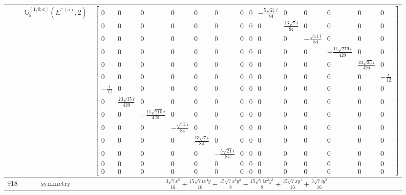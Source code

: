 \documentclass[fleqn,8pt,landscape]{jsarticle}
\begin{document}
\begin{longtable}{ccc}
$  $ & $ \mathbb{G}_{5}^{(1,0;a)}(E^{\prime\prime(a)},2) $ & $ \begin{bmatrix} 0 & 0 & 0 & 0 & 0 & 0 & 0 & 0 & - \frac{5 \sqrt{21} i}{84} & 0 & 0 & 0 & 0 & 0 \\ 0 & 0 & 0 & 0 & 0 & 0 & 0 & 0 & 0 & \frac{13 \sqrt{7} i}{84} & 0 & 0 & 0 & 0 \\ 0 & 0 & 0 & 0 & 0 & 0 & 0 & 0 & 0 & 0 & - \frac{\sqrt{14} i}{84} & 0 & 0 & 0 \\ 0 & 0 & 0 & 0 & 0 & 0 & 0 & 0 & 0 & 0 & 0 & - \frac{11 \sqrt{210} i}{420} & 0 & 0 \\ 0 & 0 & 0 & 0 & 0 & 0 & 0 & 0 & 0 & 0 & 0 & 0 & \frac{23 \sqrt{35} i}{420} & 0 \\ 0 & 0 & 0 & 0 & 0 & 0 & 0 & 0 & 0 & 0 & 0 & 0 & 0 & - \frac{i}{12} \\ - \frac{i}{12} & 0 & 0 & 0 & 0 & 0 & 0 & 0 & 0 & 0 & 0 & 0 & 0 & 0 \\ 0 & \frac{23 \sqrt{35} i}{420} & 0 & 0 & 0 & 0 & 0 & 0 & 0 & 0 & 0 & 0 & 0 & 0 \\ 0 & 0 & - \frac{11 \sqrt{210} i}{420} & 0 & 0 & 0 & 0 & 0 & 0 & 0 & 0 & 0 & 0 & 0 \\ 0 & 0 & 0 & - \frac{\sqrt{14} i}{84} & 0 & 0 & 0 & 0 & 0 & 0 & 0 & 0 & 0 & 0 \\ 0 & 0 & 0 & 0 & \frac{13 \sqrt{7} i}{84} & 0 & 0 & 0 & 0 & 0 & 0 & 0 & 0 & 0 \\ 0 & 0 & 0 & 0 & 0 & - \frac{5 \sqrt{21} i}{84} & 0 & 0 & 0 & 0 & 0 & 0 & 0 & 0 \\ 0 & 0 & 0 & 0 & 0 & 0 & 0 & 0 & 0 & 0 & 0 & 0 & 0 & 0 \\ 0 & 0 & 0 & 0 & 0 & 0 & 0 & 0 & 0 & 0 & 0 & 0 & 0 & 0 \end{bmatrix} $ \\ \hline
$ 918 $ & $ \text{symmetry} $ & $ \frac{3 \sqrt{7} x^{5}}{16} + \frac{15 \sqrt{7} i x^{4} y}{16} - \frac{15 \sqrt{7} x^{3} y^{2}}{8} - \frac{15 \sqrt{7} i x^{2} y^{3}}{8} + \frac{15 \sqrt{7} x y^{4}}{16} + \frac{3 \sqrt{7} i y^{5}}{16} $ \\

\end{longtable}
\end{document}

